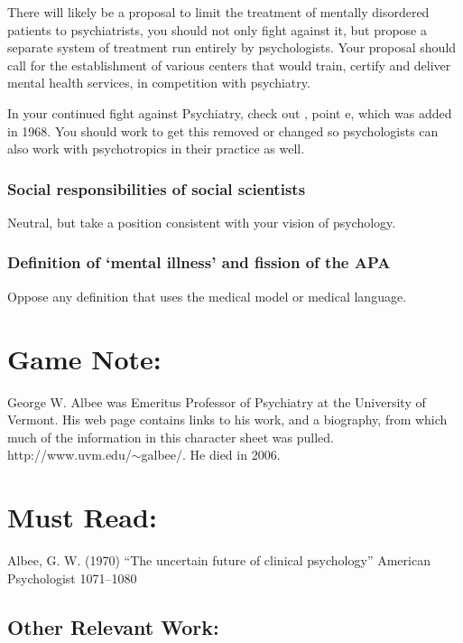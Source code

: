 \begin{refsection}
There will likely be a proposal to limit the treatment of mentally disordered patients to psychiatrists, you should not only fight against it, but propose a separate system of treatment run entirely by psychologists. Your proposal should call for the establishment of various centers that would train, certify and deliver mental health services, in competition with psychiatry. 

In your continued fight against Psychiatry, check out , point e, which was added in 1968. You should work to get this removed or changed so psychologists can also work with psychotropics in their practice as well.

\subsubsection{Social responsibilities of social scientists}
\label{socialresponsibilitiesofsocialscientists}

Neutral, but take a position consistent with your vision of psychology.

\subsubsection{Definition of ‘mental illness’ and fission of the APA}
\label{definitionof‘mentalillness’andfissionoftheapa}

Oppose any definition that uses the medical model or medical language.

\section{Game Note:}
\label{gamenote:}

George W. Albee was Emeritus Professor of Psychiatry at the University of Vermont. His web page contains links to his work, and a biography, from which much of the information in this character sheet was pulled. http:\slash \slash www.uvm.edu\slash \ensuremath{\sim}galbee\slash . He died in 2006.

\section{Must Read:}
\label{mustread:}

Albee, G. W. (1970) “The uncertain future of clinical psychology” American Psychologist 1071--1080

\subsection{Other Relevant Work:}
\label{otherrelevantwork:}


\end{refsection}
